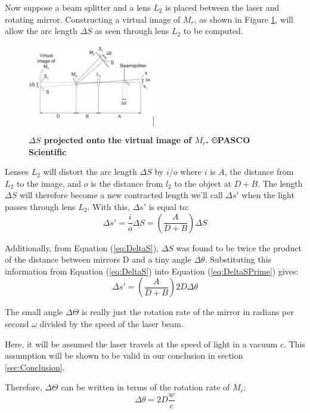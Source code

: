 \documentclass[twocolumn]{article}
\begin{document}
	Now suppose a beam splitter and a lens $L_2$ is placed between the laser and rotating mirror. 
	Constructing a virtual image of $M_r$, as shown in Figure \ref{fig:VirtualImage}, will allow the arc length $\Delta S$ as seen through lens $L_2$ to be computed. 
	\begin{figure}[!ht]
		\centering
		\includegraphics[width=0.49\textwidth]{Images/VirtualImageDiagram}]
		\caption{\textbf{$\Delta S$ projected onto the virtual image of $M_r$.\cite{lee_instruction_????} \copyright PASCO Scientific}}
		\label{fig:VirtualImage}
	\end{figure}
	
	Lenses $L_2$ will distort the arc length $\Delta S$ by $i/o$ where $i$ is $A$, the distance from $L_2$ to the image, and $o$ is the distance from $l_2$ to the object at $D + B$. 
	The length $\Delta S$ will therefore become a new contracted length we'll call  $\Delta s'$ when the light passes through lens $L_2$. 
	With this, $\Delta s'$ is equal to:
	\begin{equation}
		\Delta s' = \frac{i}{o} \Delta S = (\frac{A}{D+B})\Delta S
		\label{eq:DeltaSPrime}
	\end{equation}
	
	Additionally, from Equation (\ref{eq:DeltaS}), $\Delta S$ was found to be twice the product of the distance between mirrors D and a tiny angle $\Delta \theta$. Substituting this information from Equation (\ref{eq:DeltaS}) into Equation (\ref{eq:DeltaSPrime}) gives:
	\begin{equation}
		\Delta s' = (\frac{A}{D+B})2D\Delta\theta
		\label{eq:DeltaSPrime2}
	\end{equation}
	
	The small angle $\Delta \Theta$ is really just the rotation rate of the mirror in radians per second $\omega$ divided by the speed of the laser beam. 
	
	Here, it will be assumed the laser travels at the speed of light in a vacuum $c$.
	This assumption will be shown to be valid in our conclusion in section \ref{sec:Conclusion}.
	
	Therefore, $\Delta \Theta$ can be written in terms of the rotation rate of $M_r$:
	\begin{equation}
		\Delta\theta = 2D\frac{w}{c}
		\label{eq:DeltaTheta}
	\end{equation}
	
\end{document}
